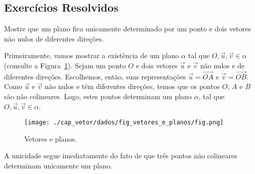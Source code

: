 \subsection{Exercícios Resolvidos}

\begin{exeresol}
  Mostre que um plano fica unicamente determinado por um ponto e dois vetores não nulos de diferentes direções.
\end{exeresol}
\begin{resol}
  Primeiramente, vamos mostrar a existência de um plano $\alpha$ tal que $O, \vec{u}, \vec{v}\in\alpha$ (consulte a Figura~\ref{cap_vetor_sec_vetor:fig:vetores_e_planos}). Sejam um ponto $O$ e dois vetores $\vec{u}$ e $\vec{v}$ não nulos e de diferentes direções. Escolhemos, então, suas representações $\vec{u} = \overrightarrow{OA}$ e $\vec{v} = \overrightarrow{OB}$. Como $\vec{u}$ e $\vec{v}$ não nulos e têm diferentes direções, temos que os pontos $O$, $A$ e $B$ são não colineares. Logo, estes pontos determinam um plano $\alpha$, tal que $O, \vec{u}, \vec{v} \in \alpha$.

  \begin{figure}[h!]
    \centering
    \texttt{[image: ./cap\_vetor/dados/fig\_vetores\_e\_planos/fig.png]}
    \caption{Vetores e planos.}
    \label{cap_vetor_sec_vetor:fig:vetores_e_planos}
  \end{figure}
  
  A unicidade segue imediatamente do fato de que três pontos não colineares determinam unicamente um plano.

\end{resol}

